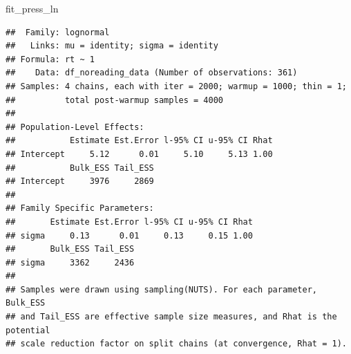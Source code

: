 \documentclass[12pt,ignorenonframetext,aspectratio=169]{beamer}
\newenvironment{Shaded}{\begin{snugshade}}{\end{snugshade}}
\newcommand{\DataTypeTok}[1]{\textcolor[rgb]{0.13,0.29,0.53}{#1}}
\newcommand{\DecValTok}[1]{\textcolor[rgb]{0.00,0.00,0.81}{#1}}
\newcommand{\FloatTok}[1]{\textcolor[rgb]{0.00,0.00,0.81}{#1}}
\newcommand{\KeywordTok}[1]{\textcolor[rgb]{0.13,0.29,0.53}{\textbf{#1}}}
\newcommand{\NormalTok}[1]{#1}
\newcommand{\OperatorTok}[1]{\textcolor[rgb]{0.81,0.36,0.00}{\textbf{#1}}}
\newcommand{\StringTok}[1]{\textcolor[rgb]{0.31,0.60,0.02}{#1}}
\begin{document}
\begin{frame}[fragile]


\end{frame}

\begin{frame}[fragile]

\scriptsize

\begin{Shaded}
\begin{Highlighting}[]
\NormalTok{fit_press_ln}
\end{Highlighting}
\end{Shaded}

\begin{verbatim}
##  Family: lognormal 
##   Links: mu = identity; sigma = identity 
## Formula: rt ~ 1 
##    Data: df_noreading_data (Number of observations: 361) 
## Samples: 4 chains, each with iter = 2000; warmup = 1000; thin = 1;
##          total post-warmup samples = 4000
## 
## Population-Level Effects: 
##           Estimate Est.Error l-95% CI u-95% CI Rhat
## Intercept     5.12      0.01     5.10     5.13 1.00
##           Bulk_ESS Tail_ESS
## Intercept     3976     2869
## 
## Family Specific Parameters: 
##       Estimate Est.Error l-95% CI u-95% CI Rhat
## sigma     0.13      0.01     0.13     0.15 1.00
##       Bulk_ESS Tail_ESS
## sigma     3362     2436
## 
## Samples were drawn using sampling(NUTS). For each parameter, Bulk_ESS
## and Tail_ESS are effective sample size measures, and Rhat is the potential
## scale reduction factor on split chains (at convergence, Rhat = 1).
\end{verbatim}

\normalsize

\end{frame}
\end{document}
